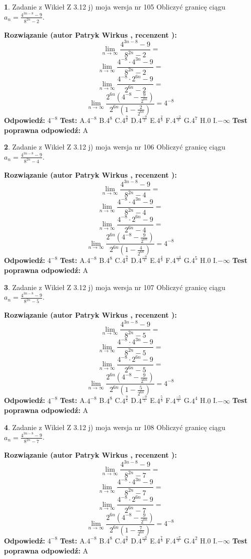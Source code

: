 \documentclass[12pt, a4paper]{article}
\theoremstyle{definition} %
\newtheorem{zad}{}
\newcommand{\zadStart}[1]{\begin{zad}#1\newline}
\newcommand{\zadStop}{\end{zad}}
\newcommand{\rozwStart}[2]{\noindent \textbf{Rozwiązanie (autor #1 , recenzent #2): }\newline}
\newcommand{\rozwStop}{\newline}
\newcommand{\odpStart}{\noindent \textbf{Odpowiedź:}\newline}
\newcommand{\odpStop}{\newline}
\newcommand{\testStart}{\noindent \textbf{Test:}\newline}
\newcommand{\testStop}{\newline}
\newcommand{\kluczStart}{\noindent \textbf{Test poprawna odpowiedź:}\newline}
\newcommand{\kluczStop}{\newline}
\begin{document}
\zadStart{Zadanie z Wikieł Z 3.12 j) moja wersja nr 105}
Obliczyć granicę ciągu $a_{n}=\frac{4^{3n-8}-9}{8^{2n}-2}$.
\zadStop
\rozwStart{Patryk Wirkus}{}
$$\lim\limits_{n\to\infty}\frac{4^{3n-8}-9}{8^{2n}-2}=$$
$$\lim\limits_{n\to\infty}\frac{4^{-8} \cdot 4^{3n}-9}{8^{2n}-2}=$$
$$\lim\limits_{n\to\infty}\frac{4^{-8} \cdot 2^{6n}-9}{2^{6n}-2}=$$
$$\lim\limits_{n\to\infty}\frac{2^{6n}(4^{-8} - \frac{9}{2^{6n}})}{2^{6n}(1-\frac{2}{2^{6n}})}= 4^{-8}$$
\rozwStop
\odpStart
$4^{-8}$
\odpStop
\testStart
A.$4^{-8}$
B.$4^{8}$
C.$4^{\frac{9}{2}}$
D.$4^{\frac{-9}{2}}$
E.$4^{\frac{2}{9}}$
F.$4^{\frac{-2}{9}}$
G.$4^{7}$
H.$0$
I.$-\infty$
\testStop
\kluczStart
A
\kluczStop



\zadStart{Zadanie z Wikieł Z 3.12 j) moja wersja nr 106}
Obliczyć granicę ciągu $a_{n}=\frac{4^{3n-8}-9}{8^{2n}-4}$.
\zadStop
\rozwStart{Patryk Wirkus}{}
$$\lim\limits_{n\to\infty}\frac{4^{3n-8}-9}{8^{2n}-4}=$$
$$\lim\limits_{n\to\infty}\frac{4^{-8} \cdot 4^{3n}-9}{8^{2n}-4}=$$
$$\lim\limits_{n\to\infty}\frac{4^{-8} \cdot 2^{6n}-9}{2^{6n}-4}=$$
$$\lim\limits_{n\to\infty}\frac{2^{6n}(4^{-8} - \frac{9}{2^{6n}})}{2^{6n}(1-\frac{4}{2^{6n}})}= 4^{-8}$$
\rozwStop
\odpStart
$4^{-8}$
\odpStop
\testStart
A.$4^{-8}$
B.$4^{8}$
C.$4^{\frac{9}{4}}$
D.$4^{\frac{-9}{4}}$
E.$4^{\frac{4}{9}}$
F.$4^{\frac{-4}{9}}$
G.$4^{5}$
H.$0$
I.$-\infty$
\testStop
\kluczStart
A
\kluczStop



\zadStart{Zadanie z Wikieł Z 3.12 j) moja wersja nr 107}
Obliczyć granicę ciągu $a_{n}=\frac{4^{3n-8}-9}{8^{2n}-5}$.
\zadStop
\rozwStart{Patryk Wirkus}{}
$$\lim\limits_{n\to\infty}\frac{4^{3n-8}-9}{8^{2n}-5}=$$
$$\lim\limits_{n\to\infty}\frac{4^{-8} \cdot 4^{3n}-9}{8^{2n}-5}=$$
$$\lim\limits_{n\to\infty}\frac{4^{-8} \cdot 2^{6n}-9}{2^{6n}-5}=$$
$$\lim\limits_{n\to\infty}\frac{2^{6n}(4^{-8} - \frac{9}{2^{6n}})}{2^{6n}(1-\frac{5}{2^{6n}})}= 4^{-8}$$
\rozwStop
\odpStart
$4^{-8}$
\odpStop
\testStart
A.$4^{-8}$
B.$4^{8}$
C.$4^{\frac{9}{5}}$
D.$4^{\frac{-9}{5}}$
E.$4^{\frac{5}{9}}$
F.$4^{\frac{-5}{9}}$
G.$4^{4}$
H.$0$
I.$-\infty$
\testStop
\kluczStart
A
\kluczStop



\zadStart{Zadanie z Wikieł Z 3.12 j) moja wersja nr 108}
Obliczyć granicę ciągu $a_{n}=\frac{4^{3n-8}-9}{8^{2n}-7}$.
\zadStop
\rozwStart{Patryk Wirkus}{}
$$\lim\limits_{n\to\infty}\frac{4^{3n-8}-9}{8^{2n}-7}=$$
$$\lim\limits_{n\to\infty}\frac{4^{-8} \cdot 4^{3n}-9}{8^{2n}-7}=$$
$$\lim\limits_{n\to\infty}\frac{4^{-8} \cdot 2^{6n}-9}{2^{6n}-7}=$$
$$\lim\limits_{n\to\infty}\frac{2^{6n}(4^{-8} - \frac{9}{2^{6n}})}{2^{6n}(1-\frac{7}{2^{6n}})}= 4^{-8}$$
\rozwStop
\odpStart
$4^{-8}$
\odpStop
\testStart
A.$4^{-8}$
B.$4^{8}$
C.$4^{\frac{9}{7}}$
D.$4^{\frac{-9}{7}}$
E.$4^{\frac{7}{9}}$
F.$4^{\frac{-7}{9}}$
G.$4^{2}$
H.$0$
I.$-\infty$
\testStop
\kluczStart
A
\kluczStop
\end{document}
